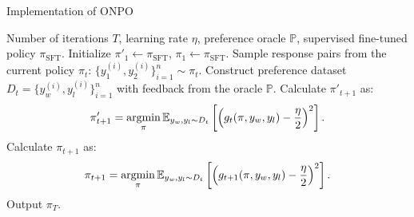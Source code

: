 \begin{algorithm}[t]
\caption{Implementation of ONPO
\label{alg:onpo_prac}
}
\begin{algorithmic}[1]
 Number of iterations $T$, learning rate $\eta$, preference oracle $\mathbb{P}$, supervised fine-tuned policy $\pi_{\textrm{SFT}}$.
\STATE Initialize $\pi'_1 \leftarrow \pi_{\textrm{SFT}}$, $\pi_1 \leftarrow \pi_{\textrm{SFT}}$.
\STATE Sample response pairs from the current policy $\pi_t$: $\{y_1^{(i)},y_2^{(i)}\}_{i=1}^n \sim \pi_t$.
\STATE Construct preference dataset $D_t=\{y_w^{(i)},y_l^{(i)}\}_{i=1}^n$ with feedback from the oracle $\mathbb{P}$.
\STATE Calculate $\pi'_{t+1}$ as:
\begin{align*}
\pi'_{t+1}=\mathop{\mathrm{argmin}}_{\pi} \mathbb{E}_{y_w,y_l \sim D_t}\left[\left(g_{t}(\pi,y_w,y_l)-\frac{\eta}{2}\right)^2\right].
\end{align*}
\STATE Calculate $\pi_{t+1}$ as:
\begin{align*}
\pi_{t+1}=\mathop{\mathrm{argmin}}_{\pi} \mathbb{E}_{y_w,y_l \sim D_t}\left[\left(g_{t+1}(\pi,y_w,y_l)-\frac{\eta}{2}\right)^2\right].
\end{align*}
\ENDFOR
\STATE Output $\pi_T$.
\end{algorithmic}
\end{algorithm}







